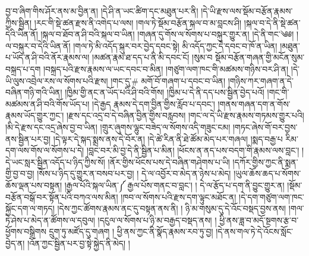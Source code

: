 བྱ་བ་ཞིག་གིས་ཤོར་ནས་མ་བྱིན་ན། །དེ་ཤི་ན་ཡང་ཚིག་དང་མཐུན་པར་ནི། །དེ་ཡི་རྫས་ལས་སྡོམ་བརྩོན་རྣམས་ཀྱིས་སྦྱིན། །རང་གི་སྡེ་ཚན་རྫས་ནི་འགེད་པ་ལས། །གལ་ཏེ་སྡོམ་བརྩོན་སྐལ་བ་མ་བླངས་ཤི། །སྐལ་བ་དེ་ནི་སྡེ་ཚན་དེའི་ཡིན་ནོ། །སྐལ་བ་ཐོབ་ན་ཤི་བའི་སྐལ་བ་ཡིན། །གཞན་དུ་གོས་ལ་སོགས་པ་བསྐུར་གྱུར་ན། །དེ་ནི་གང་༄༅། ། ལ་བསྐུར་བ་དེའི་ཡིན་ནོ། །གལ་ཏེ་མི་འདོད་སྐུར་བར་བྱེད་དབང་སྟེ། མི་འདོད་ཀྱང་དེ་དབང་བ་ཁོ་ན་ཡིན། །མཐུན་པ་ཡོད་ན་ཤི་བའི་ནོར་རྣམས་ལ། །མཚན་རྣམ་ཐ་དད་པ་ནི་མི་དབང་ངོ། །སུམ་བ སྡོམ་བརྩོན་གཞན་གྱི་མངོན་སུམ་བསྐྲད་པ་དག །བསྐྲད་པའི་རྫས་རྣམས་ལ་ཡང་དབང་བ་མིན། །གཙུག་ལག་ཁང་གི་མཚམས་གཉིས་བར་ཤི་ན། །དེ་ཡི་ལུས་འབྲེལ་རས་ལ་སོགས་པའི་རྫས། །གང་དུ་# མགོ་བོ་གཞག་པ་དབང་བ་ཡིན། །གཉིས་ཀར་གཞག་ན་དེ་བཞིན་གཉི་གའི་ཡིན། །ཁྱིམ་གྱི་ནང་ན་ཡོད་པའི་ཤི་བའི་གོས། །ཁྱིམ་པ་དེ་ནི་དད་པས་སྦྱིན་བྱེད་པའོ། །གང་གི་མཚམས་ན་ཤི་བའི་གོས་ཡོད་པ། །དེ་རྒྱད རྣམས་དེ་དག་བྱིན་གྱིས་རློབ་པ་དབང་། །གནས་གཞན་དག་ན་གོས་རྣམས་ཡོད་གྱུར་ཀྱང་། །རྫས་དང་འདྲ་བ་དེ་བཞིན་བྱིན་གྱིས་བརླབས། །གང་ལ་དེ་ཡི་རྫས་རྣམས་གཏམས་གྱུར་པའི། །མི་དེ་རྫས་དང་འདྲ་ཞེས་བྱ་བ་ཡིན། །གྲུར་ཞུགས་ལྷུང་བཟེད་ལ་སོགས་འདི་གཟུང་ངམ། །གཏང་ཞེས་གོ་བར་བྱས་ནས་སྦྱིན་པར་བྱ། །དེ་ལྟར་དེ་སྐད་སྨྲས་ནས་དེ་བོར་ན། །དེ་ཚེ་རིན་ནི་ཐེ་ཚོམ་མེད་པར་གཞལ། །སྨད་བརྒྱ་པ རིམ་དག་ལས་གོས་ལ་སོགས་པ་དེ། །བླང་བར་མི་བྱ་དེ་ནི་སྦྱིན་པ་མིན། །ཕོངས་ན་ནད་པས་བདག་གི་རྣམས་ལས་བླང་། །དེ་ཡང་སླར་སྦྱིན་འདོད་པ་ཉིད་ཀྱིས་སོ། །ནོར་གྱིས་ཕོངས་པས་དེ་བཞིན་གཤེགས་པ་ཡི། །དཀོར་གྱིས་ཀྱང་ནི་སྨན་གྱི་བྱ་བ་བྱ། །སོས་པ་ཉིད་དུ་གྱུར་ན་བསབ་པར་བྱ། ། དེ་ལ་འབྱོར་བ་མེད་ན་ཉེས་པ་མེད། །ཡུལ་ཆོས་ཆད་པ་སོགས་ཆོས་ལྡན་པས་བསྟན། །རྒྱལ་པོའི་སྐལ་ཡིན་༼ རྒྱལ་པོས་གནང་བ་བླང་། ། དེ་ལ་རྩོད་པ་དག་ནི་བྱུང་གྱུར་ན། །སྡོམ་བརྩོན་བསྒོ་བར་སྟོན་པའི་བཀའ་ལས་མིན། །ཁབ་ལ་སོགས་པའི་རྫས་དག་ལྟུང་མཐོང་ན། །དེ་དག་གཙུག་ལག་ཁང་སྐྱོང་དག་ལ་གཏད། །དེས་ཀྱང་ཚོགས་རྣམས་ནང་དུ་བསྟན་ནས་ནི། ། ཉི་མ་གསུམ་དུ་དེ་འོང་བསྡད་བྱས་ནས། །གལ་ཏེ་ཤེས་པ་མེད་ན་ཚོགས་ལ་དབུལ། །དངུལ་ལ་སོགས་པ་ཉི་མ་བརྒྱད་བསྡད་ནས། ། ཕྱི་ནས་ཟླ་བ་མདོ་སྔགས་རྩ་བ་ཕྱོགས་བསྒྲིགས དྲུག་ཏུ་མཛོད་དུ་གཞག ། ཕྱི་ནས་ཀྱང་ནི་སྣོད་རྣམས་རབ་ཏུ་བྱ། །དེ་ནས་གལ་ཏེ་དེ་འོངས་སློང་བྱེད་ན། །འོན་ཀྱང་སྦྱིན་པར་བྱ་སྟེ་སྐྱེད་ནི་མེད། །
